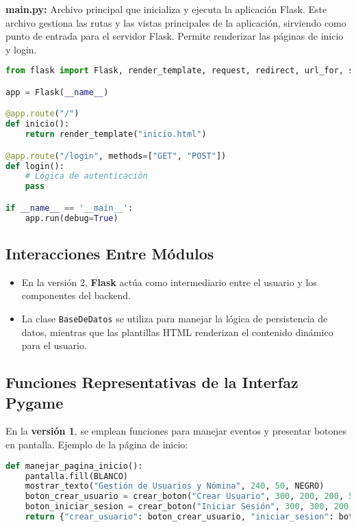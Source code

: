 \documentclass[a4paper,12pt]{article}
\begin{document}
\textbf{main.py:} Archivo principal que inicializa y ejecuta la aplicación Flask. Este archivo gestiona las rutas y las vistas principales de la aplicación, sirviendo como punto de entrada para el servidor Flask. Permite renderizar las páginas de inicio y login.

\begin{lstlisting}[language=Python, caption={Archivo main.py}]
from flask import Flask, render_template, request, redirect, url_for, session

app = Flask(__name__)

@app.route("/")
def inicio():
    return render_template("inicio.html")

@app.route("/login", methods=["GET", "POST"])
def login():
    # Lógica de autenticación
    pass

if __name__ == '__main__':
    app.run(debug=True)
\end{lstlisting}

\subsection{Interacciones Entre Módulos}

\begin{itemize}
    \item En la versión 2, \textbf{Flask} actúa como intermediario entre el usuario y los componentes del backend.
    \item La clase \texttt{BaseDeDatos} se utiliza para manejar la lógica de persistencia de datos, mientras que las plantillas HTML renderizan el contenido dinámico para el usuario.
\end{itemize}

\subsection{Funciones Representativas de la Interfaz Pygame}

En la \textbf{versión 1}, se emplean funciones para manejar eventos y presentar botones en pantalla. Ejemplo de la página de inicio:

\begin{lstlisting}[language=Python, caption={Función manejar\_pagina\_inicio}]
def manejar_pagina_inicio():
    pantalla.fill(BLANCO)
    mostrar_texto("Gestión de Usuarios y Nómina", 240, 50, NEGRO)
    boton_crear_usuario = crear_boton("Crear Usuario", 300, 200, 200, 50, AZUL, BLANCO)
    boton_iniciar_sesion = crear_boton("Iniciar Sesión", 300, 300, 200, 50, VERDE, BLANCO)
    return {"crear_usuario": boton_crear_usuario, "iniciar_sesion": boton_iniciar_sesion}
\end{lstlisting}
\end{document}
